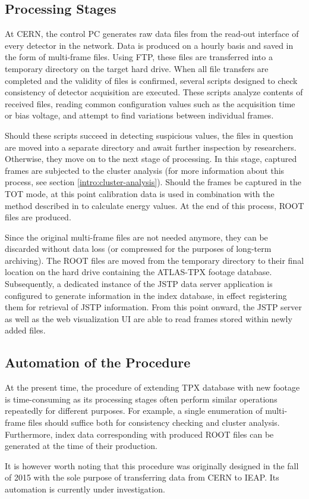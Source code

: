 \subsection{Processing Stages}
At CERN, the control PC generates raw data files from the read-out interface of every detector in the network. Data is produced on a hourly basis and saved in the form of multi-frame files. Using FTP, these files are transferred into a temporary directory on the target hard drive. When all file transfers are completed and the validity of files is confirmed, several scripts designed to check consistency of detector acquisition are executed. These scripts analyze contents of received files, reading common configuration values such as the acquisition time or bias voltage, and attempt to find variations between individual frames.

Should these scripts succeed in detecting suspicious values, the files in question are moved into a separate directory and await further inspection by researchers. Otherwise, they move on to the next stage of processing. In this stage, captured frames are subjected to the cluster analysis (for more information about this process, see section \ref{intro:cluster-analysis}). Should the frames be captured in the TOT mode, at this point calibration data is used in combination with the method described in \cite{EnergyCalibration} to calculate energy values. At the end of this process, ROOT files are produced.

Since the original multi-frame files are not needed anymore, they can be discarded without data loss (or compressed for the purposes of long-term archiving). The ROOT files are moved from the temporary directory to their final location on the hard drive containing the ATLAS-TPX footage database. Subsequently, a dedicated instance of the JSTP data server application is configured to generate information in the index database, in effect registering them for retrieval of JSTP information. From this point onward, the JSTP server as well as the web visualization UI are able to read frames stored within newly added files.

\subsection{Automation of the Procedure}
\label{import-automation}
At the present time, the procedure of extending TPX database with new footage is time-consuming as its processing stages often perform similar operations repeatedly for different purposes. For example, a single enumeration of multi-frame files should suffice both for consistency checking and cluster analysis. Furthermore, index data corresponding with produced ROOT files can be generated at the time of their production.

It is however worth noting that this procedure was originally designed in the fall of 2015 with the sole purpose of transferring data from CERN to IEAP. Its automation is currently under investigation.
